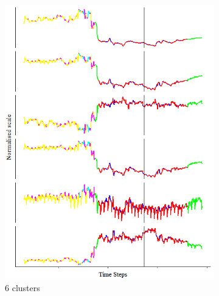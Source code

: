 \documentclass[11pt]{article} %
\theoremstyle{plain}
\theoremstyle{definition}
\begin{document}
\begin{figure}[H]
	\begin{subfigure}[b]{0.4\textwidth}
		\includegraphics[width=\textwidth]{context_timeline_6.PNG}
		\caption{\(6\) clusters}
		\label{fig:context_timeline_6}
	\end{subfigure}
	~
	\begin{subfigure}[b]{0.4\textwidth}

\end{subfigure}
\end{figure}
\end{document}
